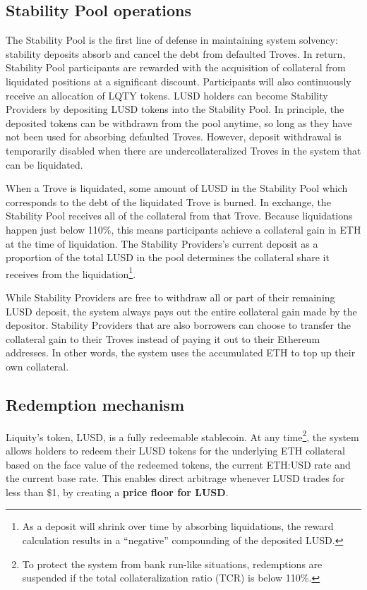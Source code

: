 \documentclass{article}
\begin{document}
\subsection{Stability Pool operations}
The Stability Pool is the first line of defense in maintaining system solvency: stability deposits absorb and cancel the debt from defaulted Troves. In return, Stability Pool participants are rewarded with the acquisition of collateral from liquidated positions at a significant discount. Participants will also continuously receive an allocation of LQTY tokens.
LUSD holders can become Stability Providers by depositing LUSD tokens into the Stability Pool. In principle, the deposited tokens can be withdrawn from the pool anytime, so long as they have not been used for absorbing defaulted Troves. However, deposit withdrawal is temporarily disabled when there are undercollateralized Troves in the system that can be liquidated.

When a Trove is liquidated, some amount of LUSD in the Stability Pool which corresponds to the debt of the liquidated Trove is burned. In exchange, the Stability Pool receives all of the collateral from that Trove. Because liquidations happen just below 110\%, this means participants achieve a collateral gain in ETH at the time of liquidation. The Stability Providers’s current deposit as a proportion of the total LUSD in the pool determines the collateral share it receives from the liquidation\footnote{As a deposit will shrink over time by absorbing liquidations, the reward calculation results in a “negative” compounding of the deposited LUSD.}. 

While Stability Providers are free to withdraw all or part of their remaining LUSD deposit, the system always pays out the entire collateral gain made by the depositor. Stability Providers that are also borrowers can choose to transfer the collateral gain to their Troves instead of paying it out to their Ethereum addresses. In other words, the system uses the accumulated ETH to top up their own collateral. 

\subsection{Redemption mechanism}
Liquity’s token, LUSD, is a fully redeemable stablecoin. At any time\footnote{To protect the system from bank run-like situations, redemptions are suspended if the total collateralization ratio (TCR) is below 110\%.}, the system allows holders to redeem their LUSD tokens for the underlying ETH collateral based on the face value of the redeemed tokens, the current ETH:USD rate and the current base rate. This enables direct arbitrage whenever LUSD trades for less than \$1, by creating a \textbf{price floor for LUSD}.\\
\end{document}
